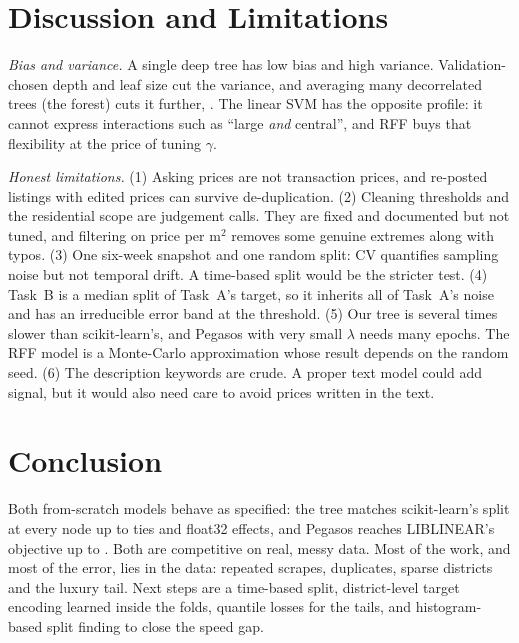 \documentclass[10pt,twocolumn,a4paper]{article}
\newcommand{\gen}[1]{}
\newcommand{\fit}[1]{\resizebox{\ifdim\width>\linewidth\linewidth\else\width\fi}{!}{#1}}
\begin{document}
\begin{table}[t]
  \centering
  \caption{Bonus: support-vector regression on Task A (test split), ours
  vs.\ scikit-learn with matched $C=1/(n\lambda)$, $\varepsilon$ and
  $\gamma$. $^\ddagger$Trained on a \SVRSubsample-row subsample
  (quadratic kernel solver).}
  \label{tab:svr}
  \fit{\gen{tab_svr}}
\end{table}



\section{Discussion and Limitations}
\emph{Bias and variance.} A single deep tree has low bias and high
variance. Validation-chosen depth and leaf size cut the variance, and
averaging many decorrelated trees (the forest) cuts it further,
\EnsembleVerdict. The linear SVM has the opposite
profile: it cannot express interactions such as ``large \emph{and}
central'', and RFF buys that flexibility at the price of tuning $\gamma$.

\emph{Honest limitations.}
(1) Asking prices are not transaction prices, and re-posted listings
with edited prices can survive de-duplication.
(2) Cleaning thresholds and the residential scope are judgement calls.
They are fixed and documented but not tuned, and filtering on price per
m$^2$ removes some genuine extremes along with typos.
(3) One six-week snapshot and one random split: CV quantifies sampling
noise but not temporal drift. A time-based split would be the stricter
test.
(4) Task~B is a median split of Task~A's target, so it inherits all of
Task~A's noise and has an irreducible error band at the threshold.
(5) Our tree is several times slower than scikit-learn's, and Pegasos
with very small $\lambda$ needs many epochs. The RFF model is a
Monte-Carlo approximation whose result depends on the random seed.
(6) The description keywords are crude. A proper text model could add
signal, but it would also need care to avoid prices written in the text.

\section{Conclusion}
Both from-scratch models behave as specified: the tree matches
scikit-learn's split at every node up to ties and float32 effects, and
Pegasos reaches LIBLINEAR's objective up to \ObjGap. Both are
competitive on real, messy data. Most of the work, and most of the error, lies in the data: repeated
scrapes, duplicates, sparse districts and the luxury tail. Next steps are
a time-based split, district-level target encoding learned inside the
folds, quantile losses for the tails, and histogram-based split finding
to close the speed gap.
\end{document}

